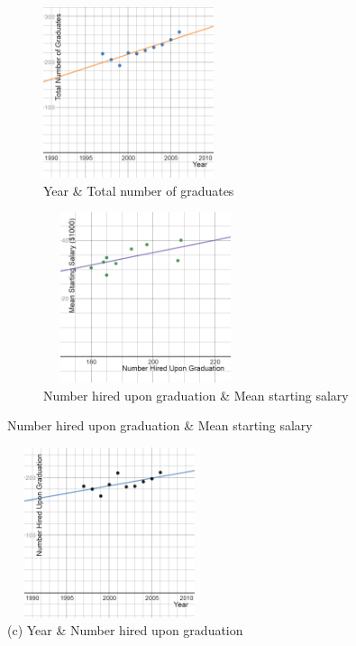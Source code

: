 \documentclass{article}
\begin{document}
\begin{figure}[h]
    \begin{subfigure}{0.5\textwidth}
        \begin{flushleft}
            \includegraphics[width=5cm, height=5cm]{partthree-graph-yearandtotalgrad}
            \caption{Year \& Total number of graduates}
        \end{flushleft}
    \end{subfigure}
    \begin{subfigure}{0.5\textwidth}
        \begin{flushright}
            \includegraphics[width=6cm, height=5cm]{partthree-graph-numhiredandmeansalary}
            \caption{Number hired upon graduation \& Mean starting salary}
        \end{flushright}
    \end{subfigure}
\end{figure}
\begin{figure}[h]
        \begin{center}
            \includegraphics[width=6cm, height=5cm]{partthree-graph-yearandnumhired}
            \caption{(c) Year \& Number hired upon graduation}
        \end{center}
\end{figure}
\end{document}
